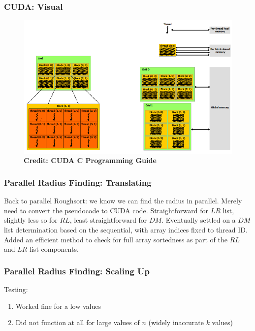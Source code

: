 \documentclass[10pt, xcolor={dvipsnames}, aspectratio=169]{beamer}
\begin{document}
\begin{frame}
	\frametitle{CUDA: Visual}
	\begin{figure}
	\centering
	\includegraphics[height=.7\textheight]{./cudaorg.png}
	\newline
	\textbf{Credit: CUDA C Programming Guide}
	\end{figure}
\end{frame}

\begin{frame}
\frametitle{Parallel Radius Finding: Translating}
Back to parallel Roughsort: we know we can find the radius in parallel.  Merely need to convert the pseudocode to CUDA code.
\newline\newline
Straightforward for $LR$ list, slightly less so for $RL$, least straightforward for $DM$.
\newline\newline
Eventually settled on a $DM$ list determination based on the sequential, with array indices fixed to thread ID.
\newline\newline
Added an efficient method to check for full array sortedness as part of the $RL$ and $LR$ list components.
\end{frame}


\begin{frame}
	\frametitle{Parallel Radius Finding: Scaling Up}
Testing:
\begin{enumerate}
	\item Worked fine for a low values
	\item Did not function at all for large values of $n$ (widely inaccurate $k$ values)
\end{enumerate}
\end{frame}
\end{document}
